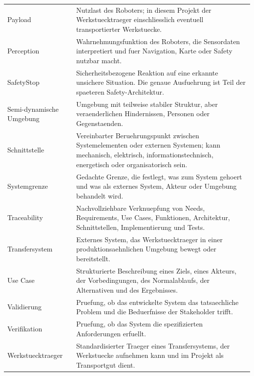 \begin{longtable}{L{0.24\textwidth} L{0.62\textwidth}}
Payload & Nutzlast des Roboters; in diesem Projekt der Werkstuecktraeger einschliesslich eventuell transportierter Werkstuecke. \\
Perception & Wahrnehmungsfunktion des Roboters, die Sensordaten interpretiert und fuer Navigation, Karte oder Safety nutzbar macht. \\
SafetyStop & Sicherheitsbezogene Reaktion auf eine erkannte unsichere Situation. Die genaue Ausfuehrung ist Teil der spaeteren Safety-Architektur. \\
Semi-dynamische Umgebung & Umgebung mit teilweise stabiler Struktur, aber veraenderlichen Hindernissen, Personen oder Gegenstaenden. \\
Schnittstelle & Vereinbarter Beruehrungspunkt zwischen Systemelementen oder externen Systemen; kann mechanisch, elektrisch, informationstechnisch, energetisch oder organisatorisch sein. \\
Systemgrenze & Gedachte Grenze, die festlegt, was zum System gehoert und was als externes System, Akteur oder Umgebung behandelt wird. \\
Traceability & Nachvollziehbare Verknuepfung von Needs, Requirements, Use Cases, Funktionen, Architektur, Schnittstellen, Implementierung und Tests. \\
Transfersystem & Externes System, das Werkstuecktraeger in einer produktionsaehnlichen Umgebung bewegt oder bereitstellt. \\
Use Case & Strukturierte Beschreibung eines Ziels, eines Akteurs, der Vorbedingungen, des Normalablaufs, der Alternativen und des Ergebnisses. \\
Validierung & Pruefung, ob das entwickelte System das tatsaechliche Problem und die Beduerfnisse der Stakeholder trifft. \\
Verifikation & Pruefung, ob das System die spezifizierten Anforderungen erfuellt. \\
Werkstuecktraeger & Standardisierter Traeger eines Transfersystems, der Werkstuecke aufnehmen kann und im Projekt als Transportgut dient. \\
\bottomrule
\end{longtable}
